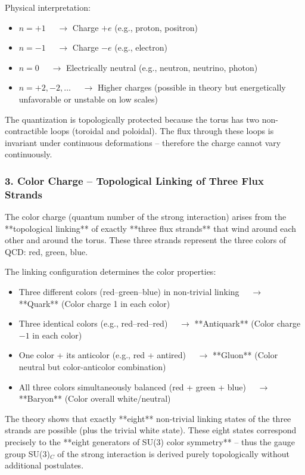 Physical interpretation:
\begin{itemize}
	\item $n = +1$ $\quad \to$ Charge $+e$ \quad (e.g., proton, positron)
	\item $n = -1$ $\quad \to$ Charge $-e$ \quad (e.g., electron)
	\item $n = 0$   $\quad \to$ Electrically neutral \quad (e.g., neutron, neutrino, photon)
	\item $n = +2, -2, \dots$ $\quad \to$ Higher charges (possible in theory but energetically unfavorable or unstable on low scales)
\end{itemize}

The quantization is topologically protected because the torus has two non-contractible loops (toroidal and poloidal). The flux through these loops is invariant under continuous deformations – therefore the charge cannot vary continuously.

\subsubsection{3. Color Charge – Topological Linking of Three Flux Strands}

The color charge (quantum number of the strong interaction) arises from the **topological linking** of exactly **three flux strands** that wind around each other and around the torus. These three strands represent the three colors of QCD: red, green, blue.

The linking configuration determines the color properties:
\begin{itemize}
	\item Three different colors (red–green–blue) in non-trivial linking $\quad \to$ **Quark** \quad (Color charge 1 in each color)
	\item Three identical colors (e.g., red–red–red) $\quad \to$ **Antiquark** \quad (Color charge $-1$ in each color)
	\item One color + its anticolor (e.g., red + antired) $\quad \to$ **Gluon** \quad (Color neutral but color-anticolor combination)
	\item All three colors simultaneously balanced (red + green + blue) $\quad \to$ **Baryon** \quad (Color overall white/neutral)
\end{itemize}

The theory shows that exactly **eight** non-trivial linking states of the three strands are possible (plus the trivial white state). These eight states correspond precisely to the **eight generators of SU(3) color symmetry** – thus the gauge group SU(3)$_C$ of the strong interaction is derived purely topologically without additional postulates.

